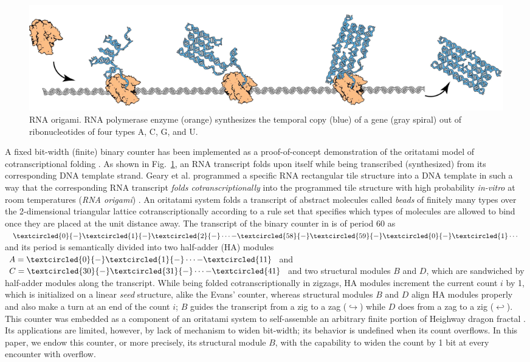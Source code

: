 \documentclass[twocolumn]{svjour3}
\begin{document}
\begin{figure}[tb]
\centering
\includegraphics[width=\linewidth]{fig/rna_origami.pdf}
\caption{RNA origami. RNA polymerase enzyme (orange) synthesizes the temporal copy (blue) of a gene (gray spiral) out of ribonucleotides of four types A, C, G, and U.}
\label{fig:rna_origami}
\end{figure}

A fixed bit-width (finite) binary counter has been implemented as a proof-of-concept demonstration of the oritatami model of cotranscriptional folding \cite{GeMeScSe2019}. 
As shown in Fig.~\ref{fig:rna_origami}, an RNA transcript folds upon itself while being transcribed (synthesized) from its corresponding DNA template strand. 
Geary et al. programmed a specific RNA rectangular tile structure into a DNA template in such a way that the corresponding RNA transcript \textit{folds cotranscriptionally} into the programmed tile structure with high probability \textit{in-vitro} at room temperatures (\textit{RNA origami}) \cite{GearyRothemundAndersen2014}. 
An oritatami system folds a transcript of abstract molecules called \textit{beads} of finitely many types over the 2-dimensional triangular lattice cotranscriptionally according to a rule set that specifies which types of molecules are allowed to bind once they are placed at the unit distance away. 
The transcript of the binary counter in \cite{GeMeScSe2019} is of period 60 as $\textcircled{\scriptsize 0}{-}\textcircled{\scriptsize 1}{-}\textcircled{\scriptsize 2}{-} \cdots {-}\textcircled{\scriptsize 58}{-}\textcircled{\scriptsize 59}{-}\textcircled{\scriptsize 0}{-}\textcircled{\scriptsize 1} \cdots$ and its period is semantically divided into two half-adder (HA) modules $A = \textcircled{\scriptsize 0}{-}\textcircled{\scriptsize 1}{-} \cdots {-}\textcircled{\scriptsize 11}$ and $C = \textcircled{\scriptsize 30}{-}\textcircled{\scriptsize 31}{-} \cdots {-}\textcircled{\scriptsize 41}$ and two structural modules $B$ and $D$, which are sandwiched by half-adder modules along the transcript.
While being folded cotranscriptionally in zigzags, HA modules increment the current count $i$ by 1, which is initialized on a linear \textit{seed} structure, alike the Evans' counter, whereas structural modules $B$ and $D$ align HA modules properly and also make a turn at an end of the count $i$; $B$ guides the transcript from a zig to a zag ($\hookrightarrow$) while $D$ does from a zag to a zig ($\hookleftarrow$). 
This counter was embedded as a component of an oritatami system to self-assemble an arbitrary finite portion of Heighway dragon fractal \cite{MasudaSekiUbukata2018}. 
Its applications are limited, however, by lack of mechanism to widen bit-width; its behavior is undefined when its count overflows. 
In this paper, we endow this counter, or more precisely, its structural module $B$, with the capability to widen the count by 1 bit at every encounter with overflow. 
\end{document}
